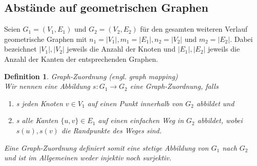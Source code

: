 \documentclass[a4paper, 12pt, twoside]{article}
\theoremstyle{Format1} %
\newtheorem{Def}{Definition}[section]       %
\begin{document}
\subsection{Abstände auf geometrischen Graphen}

Seien $ G_1=(V_1, E_1) $ und $ G_2=(V_2, E_2) $ für den gesamten weiteren Verlauf geometrische Graphen mit
$n_1 = |V_1|, m_1 = |E_1|, n_2 = |V_2|$ und $m_2 = |E_2|$. Dabei bezeichnet $|V_1|, |V_2|$ jeweils die Anzahl der Knoten und $|E_1|,|E_2|$ jeweils die Anzahl der Kanten
der entsprechenden Graphen.

\begin{Def} \label{Definition Graph-Zuordnung}
	Graph-Zuordnung (engl. graph mapping)
	\\
	Wir nennen eine Abbildung $s: G_1 \to G_2 $ eine \textit{Graph-Zuordnung}, falls
    	\begin{enumerate}
		\item[1)] s jeden Knoten $ v \in V_1 $ auf einen Punkt innerhalb von $ G_2 $ abbildet und
		\item[2)] s alle Kanten $ \{u,v\} \in E_1 $ auf einen einfachen Weg in $G_2$ abbildet, wobei $s(u), s(v)$ die Randpunkte des Weges sind.
    	\end{enumerate}

	Eine Graph-Zuordnung definiert somit eine stetige Abbildung von $ G_1 $ nach $ G_2 $ und ist im Allgemeinen weder injektiv noch surjektiv.
\end{Def}
\end{document}
